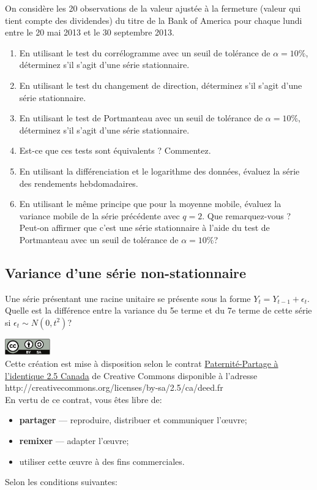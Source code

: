 \documentclass[11pt,english,francais]{article}
\begin{document}
On considère les 20 observations de la valeur ajustée à la fermeture (valeur qui tient compte des dividendes) du titre de la Bank of America pour chaque lundi entre le 20 mai 2013 et le 30 septembre 2013.

\begin{enumerate}
\item En utilisant le test du corrélogramme avec un seuil de tolérance de $\alpha = 10\%$, déterminez s'il s'agit d'une série stationnaire.

\item En utilisant le test du changement de direction, déterminez s'il s'agit d'une série stationnaire.

\item En utilisant le test de Portmanteau avec un seuil de tolérance de $\alpha = 10\%$, déterminez s'il s'agit d'une série stationnaire.

\item Est-ce que ces tests sont équivalents ? Commentez.

\item En utilisant la différenciation et le logarithme des données, évaluez la série des rendements hebdomadaires.

\item En utilisant le même principe que pour la moyenne mobile, évaluez la variance mobile de la série précédente avec $q=2$. Que remarquez-vous ? Peut-on affirmer que c'est une série stationnaire à l'aide du test de Portmanteau avec  un seuil de tolérance de $\alpha = 10\%$?
\end{enumerate}

\subsection{Variance d'une série non-stationnaire}
\label{sec:variance-dune-serie}

Une série présentant une racine unitaire se présente sous la forme $Y_t = Y_{t-1}+\epsilon_t$. Quelle est la différence entre la variance du 5e terme et du 7e terme de cette série si $\epsilon_t \sim N(0,t^2)$?

\clearpage

\includegraphics[height=7mm,keepaspectratio=true]{by-sa}\\%
Cette création est mise à disposition selon le contrat
\href{http://creativecommons.org/licenses/by-sa/2.5/ca/deed.fr}{%
  Paternité-Partage à l'identique 2.5 Canada} de Creative Commons
disponible à l'adresse \\
http://creativecommons.org/licenses/by-sa/2.5/ca/deed.fr \\
En vertu de ce contrat, vous êtes libre de:
\begin{itemize}
\item \textbf{partager} --- reproduire, distribuer et communiquer
  l'{\oe}uvre;
\item \textbf{remixer} --- adapter l'{\oe}uvre;
\item utiliser cette {\oe}uvre à des fins commerciales.
\end{itemize}
Selon les conditions suivantes:
\end{document}
